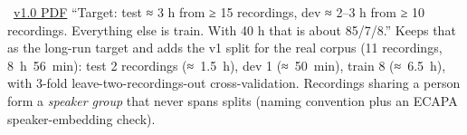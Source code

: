 \documentclass[11pt]{article}
\begin{document}
 { \textperiodcentered\ \href{archive/v1.0/02_TRD.pdf}{v1.0 PDF}}
 {``Target: test ≈ 3 h from ≥ 15 recordings, dev ≈ 2--3 h from ≥ 10 recordings. Everything else is train. With 40 h that is about 85/7/8.''}
 {Keeps that as the long-run target and adds the v1 split for the real corpus (11 recordings, 8~h~56~min): test 2 recordings (≈~1.5~h), dev 1 (≈~50~min), train 8 (≈~6.5~h), with 3-fold leave-two-recordings-out cross-validation. Recordings sharing a person form a \emph{speaker group} that never spans splits (naming convention plus an ECAPA speaker-embedding check).}
\end{document}
